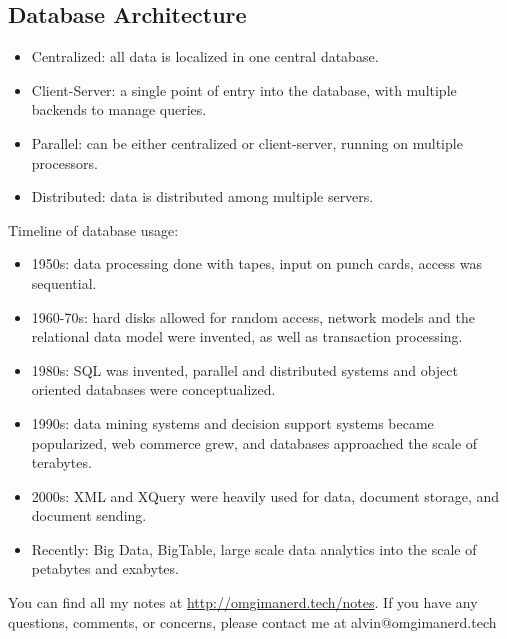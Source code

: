 \documentclass{math}
\begin{document}
\subsection*{Database Architecture}
\begin{itemize}
  \item Centralized: all data is localized in one central database.
  \item Client-Server: a single point of entry into the database, with multiple
    backends to manage queries.
  \item Parallel: can be either centralized or client-server, running on
    multiple processors.
  \item Distributed: data is distributed among multiple servers.
\end{itemize}
Timeline of database usage:
\begin{itemize}
  \item 1950s: data processing done with tapes, input on punch cards, access was
    sequential.
  \item 1960-70s: hard disks allowed for random access, network models and the
    relational data model were invented, as well as transaction processing.
  \item 1980s: SQL was invented, parallel and distributed systems and object
    oriented databases were conceptualized.
  \item 1990s: data mining systems and decision support systems became
    popularized, web commerce grew, and databases approached the scale of
    terabytes.
  \item 2000s: XML and XQuery were heavily used for data, document storage, and
    document sending.
  \item Recently: Big Data, BigTable, large scale data analytics into the scale
    of petabytes and exabytes.
\end{itemize}

\begin{center}
  You can find all my notes at \url{http://omgimanerd.tech/notes}. If you have
  any questions, comments, or concerns, please contact me at
  alvin@omgimanerd.tech
\end{center}
\end{document}
